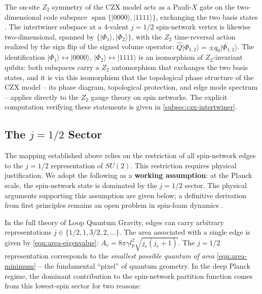 \documentclass[preprint]{SciPost}
\newcommand{\ket}[1]{\vert #1 \rangle}
\theoremstyle{plain} %
\begin{document}
The on-site $ Z_2 $ symmetry of the CZX model acts as a Pauli-$ X $ gate on the two-dimensional code subspace $ \operatorname{span}\{\ket{0000}, \ket{1111}\} $, exchanging the two basis states \cite{Chen2010Local}. The intertwiner subspace at a 4-valent $ j = 1/2 $ spin-network vertex is likewise two-dimensional, spanned by $ \{\ket{\Phi_1}, \ket{\Phi_2}\} $, with the $ Z_2 $ time-reversal action realized by the sign flip of the signed volume operator: $ \hat{Q} \ket{\Phi_{1,2}} = \pm q_0 \ket{\Phi_{1,2}} $. The identification $ \ket{\Phi_1} \leftrightarrow \ket{0000} $, $ \ket{\Phi_2} \leftrightarrow \ket{1111} $ is an isomorphism of $ Z_2 $-invariant qubits: both subspaces carry a $ Z_2 $ automorphism that exchanges the two basis states, and it is via this isomorphism that the topological phase structure of the CZX model -- its phase diagram, topological protection, and edge mode spectrum -- applies directly to the $ Z_2 $ gauge theory on spin networks. The explicit computation verifying these statements is given in \autoref{subsec:czx-intertwiner}.

\subsection{The $ j = 1/2 $ Sector}\label{subsec:j-half-dominance}

The mapping established above relies on the restriction of all spin-network edges to the $ j = 1/2 $ representation of $ SU(2) $. This restriction requires physical justification. We adopt the following as a \textbf{working assumption}: at the Planck scale, the spin-network state is dominated by the $ j = 1/2 $ sector. The physical arguments supporting this assumption are given below; a definitive derivation from first principles remains an open problem in spin-foam dynamics \cite{Dona2020Numerical,Dona2022Asymptotics}.

In the full theory of Loop Quantum Gravity, edges can carry arbitrary representations $ j \in \{1/2, 1, 3/2, 2, \ldots \} $. The area associated with a single edge is given by \eqref{eqn:area-eigenvalue}: $ A_e = 8\pi\gamma l_p^2 \sqrt{j_e(j_e + 1)} $. The $ j = 1/2 $ representation corresponds to the \emph{smallest possible quantum of area} \eqref{eqn:area-minimum} -- the fundamental ``pixel'' of quantum geometry. In the deep Planck regime, the dominant contribution to the spin-network partition function comes from this lowest-spin sector for two reasons:
\end{document}
